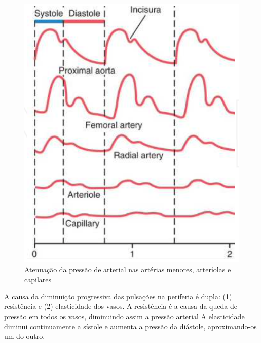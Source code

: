 \documentclass[
  portuguese,
  ]{book}
\begin{document}
\begin{figure}

{\centering \includegraphics{img/hemo_10} 

}

\caption{Atenuação da pressão de arterial nas artérias menores, arteríolas e capilares}\label{fig:imghemo10}
\end{figure}

A causa da diminuição progressiva das pulsações na periferia é dupla: (1) resistência e (2) elasticidade dos vasos. A resistência é a causa da queda de pressão em todos os vasos, diminuindo assim a pressão arterial A elasticidade diminui continuamente a sístole e aumenta a pressão da diástole, aproximando-os um do outro.

  
\end{document}

